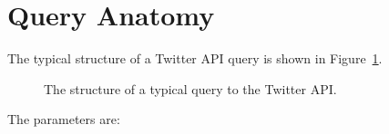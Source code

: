 \documentclass[12pt]{ucthesis}
\newcommand{\captionfonts}{\small\bf\ssp}
\begin{document}
\section{Query Anatomy}
\label{api-anatomy}
The typical structure of a Twitter API query is shown in Figure~\ref{fig:apiQuery}.

\begin{figure}[H]
   \begin{center}
      \captionfonts
      \caption[Twitter API Query]{The structure of a typical query to the Twitter API.}
      \label{fig:apiQuery}
   \end{center}
\end{figure}

The parameters are:
\end{document}
